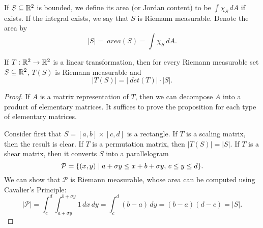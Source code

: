\begin{df}
    If $S \subseteq {\mathbb R}^2$ is bounded, we define its area (or Jordan content) to be $\int \chi_S \, dA$ if exists. If the integral exists, we say that $S$ is Riemann measurable. Denote the area by
    \[
    |S| = ~area (S) = \int \chi_S \, dA.
    \]
\end{df}

\begin{prop}
    If $T: {\mathbb R}^2 \to {\mathbb R}^2$ is a linear transformation, then for every Riemann measurable set $S \subseteq {\mathbb R}^2$, $T(S)$ is Riemann measurable and
    \[
    |T(S)| = |~det(T)| \cdot |S|.
    \]
    \begin{proof}
        If $A$ is a matrix representation of $T$, then we can decompose $A$ into a product of elementary matrices. It suffices to prove the proposition for each type of elementary matrices.

        Consider first that $S = [a, b] \times [c, d]$ is a rectangle. If $T$ is a scaling matrix, then the result is clear. If $T$ is a permutation matrix, then $|T(S)| = |S|$. If $T$ is a shear matrix, then it converts $S$ into a parallelogram
        \[
        \mathcal P = {\left\{{(x, y) \mid a + \sigma y \leq x + b + \sigma y,\, c \leq y \leq d}\right\}}.
        \]
        We can show that $\mathcal P$ is Riemann measurable, whose area can be computed using Cavalier's Principle:
        \[
        |\mathcal P| = \int_c^d \int_{a + \sigma y}^{b + \sigma y} 1 \, dx \, dy = \int_c^d (b - a) \, dy = (b - a)(d - c) = |S|.
        \]
        

\end{proof}
\end{prop}
